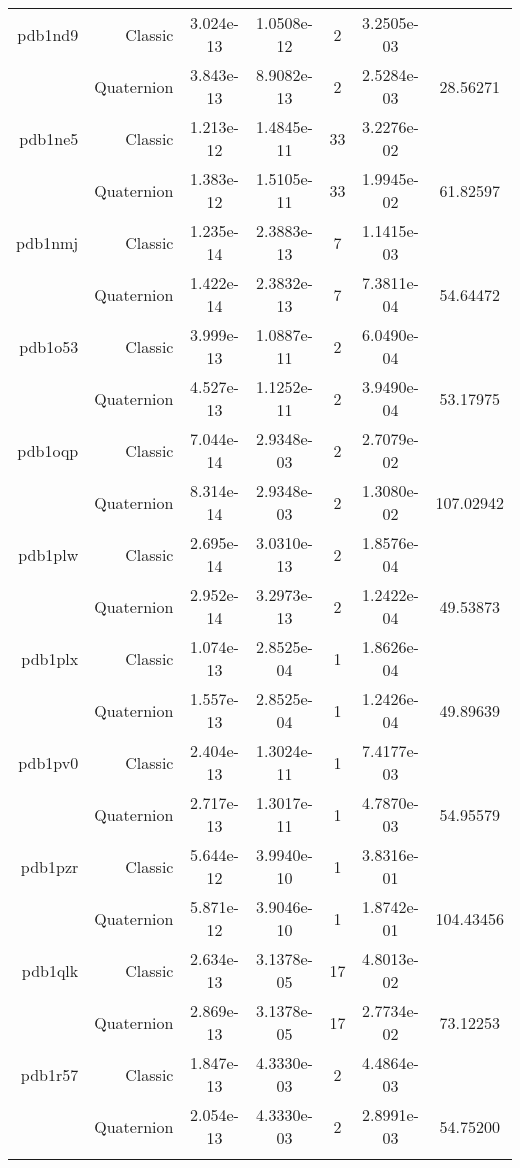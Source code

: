 \begin{xltabular}{\textwidth}{r|rS[table-format=1.3e+2]S[table-format=1.4e+2]cS[table-format=1.4e+2]S[table-format=-1.5]}
pdb1nd9 & Classic & 3.024e-13 & 1.0508e-12 & 2 & 3.2505e-03 & \\
& Quaternion & 3.843e-13 & 8.9082e-13 & 2 & 2.5284e-03 & 28.56271\\  \addlinespace
pdb1ne5 & Classic & 1.213e-12 & 1.4845e-11 & 33 & 3.2276e-02 & \\
& Quaternion & 1.383e-12 & 1.5105e-11 & 33 & 1.9945e-02 & 61.82597\\  \addlinespace
pdb1nmj & Classic & 1.235e-14 & 2.3883e-13 & 7 & 1.1415e-03 & \\
& Quaternion & 1.422e-14 & 2.3832e-13 & 7 & 7.3811e-04 & 54.64472\\  \addlinespace
pdb1o53 & Classic & 3.999e-13 & 1.0887e-11 & 2 & 6.0490e-04 & \\
& Quaternion & 4.527e-13 & 1.1252e-11 & 2 & 3.9490e-04 & 53.17975\\  \addlinespace
pdb1oqp & Classic & 7.044e-14 & 2.9348e-03 & 2 & 2.7079e-02 & \\
& Quaternion & 8.314e-14 & 2.9348e-03 & 2 & 1.3080e-02 & 107.02942\\  \addlinespace
pdb1plw & Classic & 2.695e-14 & 3.0310e-13 & 2 & 1.8576e-04 & \\
& Quaternion & 2.952e-14 & 3.2973e-13 & 2 & 1.2422e-04 & 49.53873\\  \addlinespace
pdb1plx & Classic & 1.074e-13 & 2.8525e-04 & 1 & 1.8626e-04 & \\
& Quaternion & 1.557e-13 & 2.8525e-04 & 1 & 1.2426e-04 & 49.89639\\  \addlinespace
pdb1pv0 & Classic & 2.404e-13 & 1.3024e-11 & 1 & 7.4177e-03 & \\
& Quaternion & 2.717e-13 & 1.3017e-11 & 1 & 4.7870e-03 & 54.95579\\  \addlinespace
pdb1pzr & Classic & 5.644e-12 & 3.9940e-10 & 1 & 3.8316e-01 & \\
& Quaternion & 5.871e-12 & 3.9046e-10 & 1 & 1.8742e-01 & 104.43456\\  \addlinespace
pdb1qlk & Classic & 2.634e-13 & 3.1378e-05 & 17 & 4.8013e-02 & \\
& Quaternion & 2.869e-13 & 3.1378e-05 & 17 & 2.7734e-02 & 73.12253\\  \addlinespace
pdb1r57 & Classic & 1.847e-13 & 4.3330e-03 & 2 & 4.4864e-03 & \\
& Quaternion & 2.054e-13 & 4.3330e-03 & 2 & 2.8991e-03 & 54.75200\\  \addlinespace

\end{xltabular}
